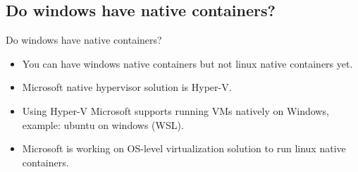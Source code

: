 \subsection{Do windows have native containers?}\label{subsec:windows-containers}
\begin{frame}{Do windows have native containers?}
    \begin{itemize}[<+- | alert@+>]
        \item You can have windows native containers but not linux native containers yet.
        \item Microsoft native hypervisor solution is Hyper-V\@.
        \item Using Hyper-V Microsoft supports running VMs natively on Windows, example: ubuntu on windows (WSL).
        \item Microsoft is working on OS-level virtualization solution to run linux native containers.
    \end{itemize}
\end{frame}
